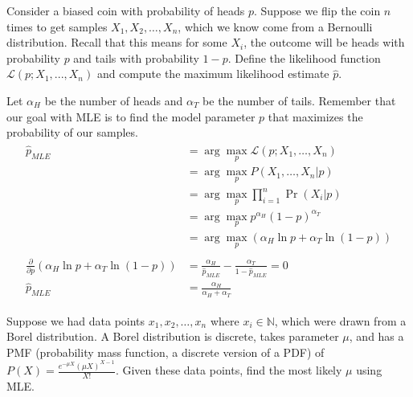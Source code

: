 
\begin{Parts}
\Part
Consider a biased coin with probability of heads $p$. Suppose
we flip the coin $n$ times to get samples $X_1, X_2, \dots, X_n$, which we know come from a Bernoulli distribution. Recall that this means for some $X_i$, the outcome will be heads with probability $p$ and tails with probability $1-p$. Define the likelihood function $\mathcal{L}(p; X_1,...,X_n)$ and compute the maximum likelihood estimate $\hat{p}$.

\begin{solution}
    Let $\alpha_H$ be the number of heads and $\alpha_T$ be the number of tails.
    Remember that our goal with MLE is to find the model parameter $p$ that maximizes the probability of our samples.
    \begin{align*}
        \begin{aligned}
            \hat{p}_{MLE} &= \arg \max_p \mathcal{L}(p; X_1,\dots,X_n) \\
            &= \arg\max_p P(X_1,\dots,X_n|p) \\
            &= \arg \max_p \prod_{i=1}^n \Pr(X_i|p) \\
            &= \arg \max_p p^{\alpha_H} (1-p)^{\alpha_T}\\
            &= \arg \max_p (\alpha_H \ln p + \alpha_T \ln(1-p))\\\\
            \frac{\partial}{\partial p} (\alpha_H \ln p + \alpha_T \ln(1-p)) &= \frac{\alpha_H}{\hat{p}_{MLE}} - \frac{\alpha_T}{1-\hat{p}_{MLE}} = 0\\
            \hat{p}_{MLE} &= \frac{\alpha_H}{\alpha_H + \alpha_T}
        \end{aligned}
    \end{align*}
\end{solution}

\iffalse
\Part
Using the same setup from part (a), suppose we now know that the parameter $p$ of the coin comes from a Gaussian distribution with mean $\mu$ and variance $\sigma^2$. Define the likelihood function again and set the derivative of the log likelihood to zero.

\begin{solution}
\end{solution}
\fi

\Part
    Suppose we had data points $x_1, x_2, \dots, x_n$ where $x_i \in \mathbb{N}$, which were drawn from a Borel distribution. A Borel distribution is discrete, takes parameter $\mu$, and has a PMF (probability mass function, a discrete version of a PDF) of $P(X)=\frac{e^{-\mu X}(\mu X)^{X-1}}{X!}$. Given these data points, find the most likely $\mu$ using MLE.


\end{Parts}

